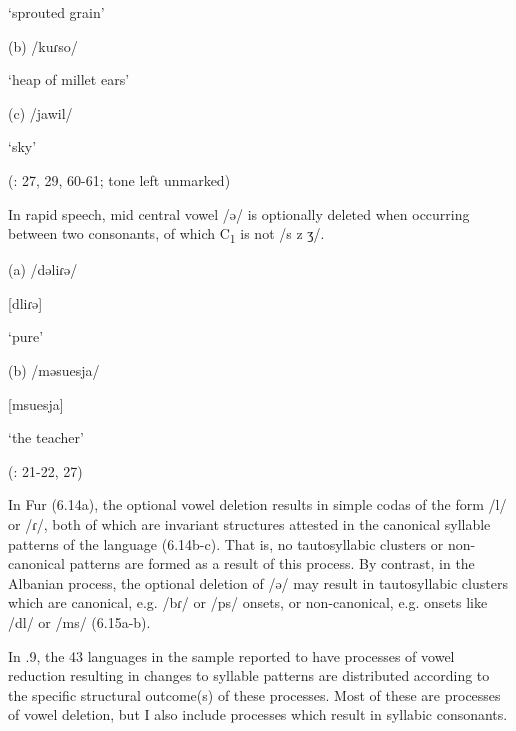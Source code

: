 \glt ‘sprouted grain’

(b)  /kuɾso/

\glt ‘heap of millet ears’

(c)  /jawil/

\glt ‘sky’

(\citealt{Jakobi1990}: 27, 29, 60-61; tone left unmarked)

\z

\ea\label{ex:(6.15)}

  In rapid speech, mid central vowel /ə/ is optionally deleted when occurring between two consonants, of which C\textsubscript{1} is not /s z ʒ/.

(a)  /dəliɾə/

[dliɾə]

\glt ‘pure’

(b)  /məsuesja/

[msuesja]

\glt ‘the teacher’

(\citealt{Klippenstein2010}: 21-22, 27)

\z

  In Fur (6.14a), the optional vowel deletion results in simple codas of the form /l/ or /ɾ/, both of which are invariant structures attested in the canonical syllable patterns of the language (6.14b-c). That is, no tautosyllabic clusters or non-canonical patterns are formed as a result of this process. By contrast, in the Albanian process, the optional deletion of /ə/ may result in tautosyllabic clusters which are canonical, e.g. /bɾ/ or /ps/ onsets, or non-canonical, e.g. onsets like /dl/ or /ms/ (6.15a-b).

  In .9, the 43 languages in the sample reported to have processes of vowel reduction resulting in changes to syllable patterns are distributed according to the specific structural outcome(s) of these processes. Most of these are processes of vowel deletion, but I also include processes which result in syllabic consonants.

